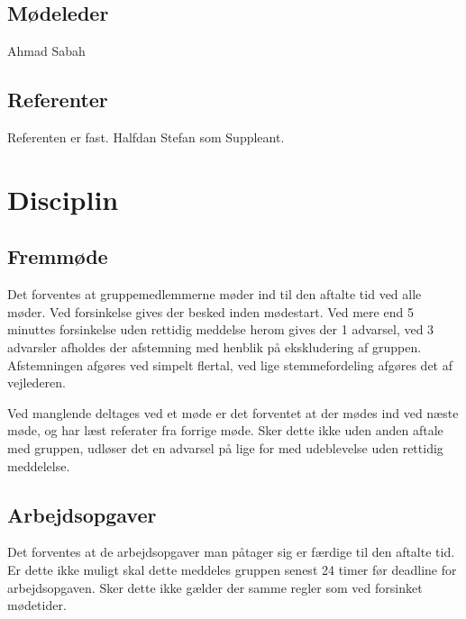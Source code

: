 \documentclass[]{article}
\begin{document}
\subsection{Mødeleder}
Ahmad Sabah
\subsection{Referenter}
Referenten er fast.
Halfdan 
Stefan som Suppleant.
\section{Disciplin}
\subsection{Fremmøde}
Det forventes at gruppemedlemmerne møder ind til den aftalte tid ved alle møder.
Ved forsinkelse gives der besked inden mødestart.  Ved mere end  5 minuttes forsinkelse uden rettidig meddelse herom gives der 1 advarsel, ved 3 advarsler afholdes der afstemning med henblik på ekskludering af gruppen. Afstemningen afgøres ved simpelt flertal, ved lige stemmefordeling afgøres det af vejlederen.

Ved manglende deltages ved et møde er det forventet at der mødes ind ved næste møde, og har læst referater fra forrige møde. Sker dette ikke uden anden aftale med gruppen, udløser det en advarsel på lige for med udeblevelse uden rettidig meddelelse.

\subsection{Arbejdsopgaver}
Det forventes at de arbejdsopgaver man påtager sig er færdige til den aftalte tid. Er dette ikke muligt skal dette meddeles gruppen senest 24 timer før deadline for arbejdsopgaven. Sker dette ikke gælder der samme regler som ved forsinket mødetider.
\end{document}
